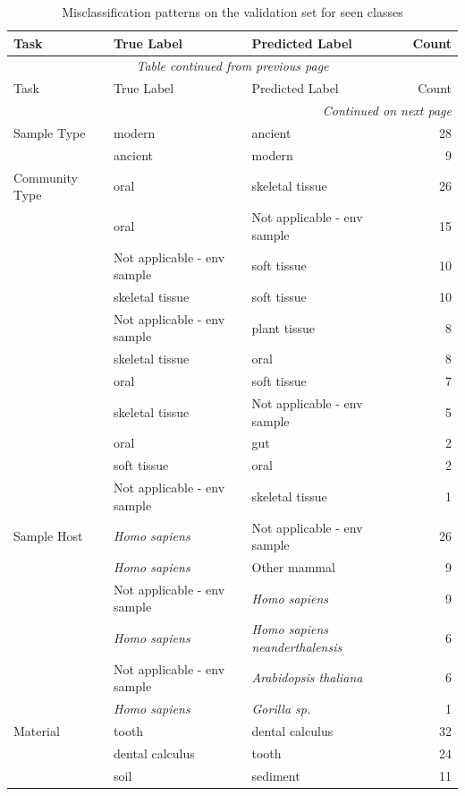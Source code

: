 \small
\begin{longtable}{lp{4cm}p{4cm}r}
\caption{Misclassification patterns on the validation set for seen classes\label{tab:wrong_merged}}\\
\toprule
Task & True Label & Predicted Label & Count \\
\midrule
\endfirsthead
\multicolumn{4}{c}{\textit{Table \thetable{} continued from previous page}} \\
\toprule
Task & True Label & Predicted Label & Count \\
\midrule
\endhead
\midrule
\multicolumn{4}{r}{\textit{Continued on next page}} \\
\endfoot
\bottomrule
\endlastfoot
Sample Type & modern & ancient & 28 \\
 & ancient & modern & 9 \\
\addlinespace
Community Type & oral & skeletal tissue & 26 \\
 & oral & Not applicable - env sample & 15 \\
 & Not applicable - env sample & soft tissue & 10 \\
 & skeletal tissue & soft tissue & 10 \\
 & Not applicable - env sample & plant tissue & 8 \\
 & skeletal tissue & oral & 8 \\
 & oral & soft tissue & 7 \\
 & skeletal tissue & Not applicable - env sample & 5 \\
 & oral & gut & 2 \\
 & soft tissue & oral & 2 \\
 & Not applicable - env sample & skeletal tissue & 1 \\
\addlinespace
Sample Host & \textit{Homo sapiens} & Not applicable - env sample & 26 \\
 & \textit{Homo sapiens} & Other mammal & 9 \\
 & Not applicable - env sample & \textit{Homo sapiens} & 9 \\
 & \textit{Homo sapiens} & \textit{Homo sapiens neanderthalensis} & 6 \\
 & Not applicable - env sample & \textit{Arabidopsis thaliana} & 6 \\
 & \textit{Homo sapiens} & \textit{Gorilla sp.} & 1 \\
\addlinespace
Material & tooth & dental calculus & 32 \\
 & dental calculus & tooth & 24 \\
 & soil & sediment & 11 \\

\end{longtable}
